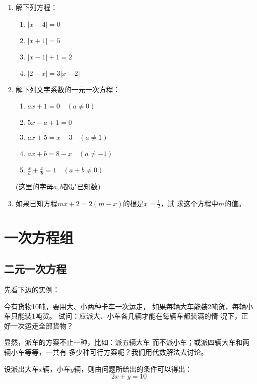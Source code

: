 \begin{enumerate}
\item 解下列方程：
\begin{multicols}{2}
\begin{enumerate}
    \item $|x-4|=0$
    \item $|x+1|=5$
    \item $|x-1|+1=2$
    \item $|2-x|=3|x-2|$
\end{enumerate}
\end{multicols}

\item 解下列文字系数的一元一次方程：
\begin{multicols}{2}
    \begin{enumerate}
        \item $ax+1=0\quad (a\ne 0)$
        \item $5x-a+1=0$
        \item $ax+5=x-3\quad (a\ne 1)$
        \item $ax+b=8-x\quad (a\ne -1)$
        \item $\frac{x}{a}+\frac{x}{b}=1\quad (a+b\ne 0)$
    \end{enumerate}
    (这里的字母$a,b$都是已知数)
    \end{multicols}

    \item 如果已知方程$mx+2=2(m-x)$的根是$x=\frac{1}{2}$，试
求这个方程中$m$的值。
\end{enumerate}


\section{一次方程组}
\subsection{二元一次方程}
    先看下边的实例：

    今有货物10吨，要用大、小两种卡车一次运走，
如果每辆大车能装2吨货，每辆小车只能装1吨货。
试问：应派大、小车各几辆才能在每辆车都装满的情
况下，正好一次运走全部货物？
    
显然，派车的方案不止一种，比如：派五辆大车
而不派小车；或派四辆大车和两辆小车等等，一共有
多少种可行方案呢？我们用代数解法去讨论。

设派出大车$x$辆，小车$y$辆，则由问题所给出的条件可以得出：
\begin{equation}
    2x+y=10
\end{equation}

